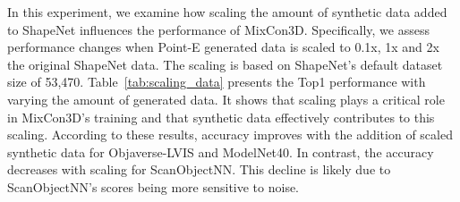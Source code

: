 % 



In this experiment, we examine how scaling the amount of synthetic data added to ShapeNet influences the performance of MixCon3D. Specifically, we assess performance changes when Point-E generated data is scaled to 0.1x, 1x and 2x the original ShapeNet data. The scaling is based on ShapeNet's default dataset size of 53,470.
Table~\ref{tab:scaling_data} presents the Top1 performance with varying the amount of generated data. It shows that scaling plays a critical role in MixCon3D's training and that synthetic data effectively contributes to this scaling. According to these results, accuracy improves with the addition of scaled synthetic data for Objaverse-LVIS and ModelNet40. In contrast, the accuracy decreases with scaling for ScanObjectNN. This decline is likely due to ScanObjectNN's scores being more sensitive to noise.
% 
